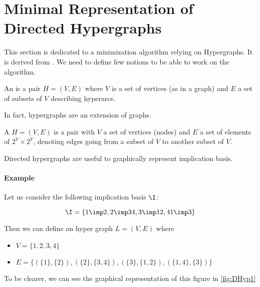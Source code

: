 \section{Minimal Representation of Directed Hypergraphs}

This section is dedicated to a minimization algorithm relying on Hypergraphs. 
It is derived from \cite{ausiello_directed_2017, ausiello_graph_1983, 
ausiello_minimal_1986}. We need to
define few notions to be able to work on the algorithm. 

\begin{definition} An  is a pair $H = 
(V, E)$ 
where $V$ is a set of vertices (as in a graph) and $E$ a set of subsets of $V$
describing hyperarcs.

\end{definition}

\noindent In fact, hypergraphs are an extension of graphs. 

\begin{definition} A  
$H = (V, E)$ is a pair with $V$ a set of vertices (nodes) and $E$ a set of 
elements of $2^V \times 2^V$, denoting edges going from a subset of $V$ to 
another subset of $V$.
	
\end{definition}

Directed hypergraphs are useful to graphically represent implication basis.

\paragraph{Example} Let us consider the following implication basis $\I$:

	\[ \I = \{ 1 \imp 2, 2 \imp 34, 3 \imp 12, 41 \imp 3 \} \]

\noindent Then we can define an hyper graph $L = (V, E)$ where
	\begin{itemize}
		\item $V = \{1, 2, 3, 4 \}$
		\item $E = \{ (\{ 1 \}, \{ 2\}), (\{ 2 \}, \{3, 4\}),
			(\{ 3 \}, \{ 1, 2\}), (\{1, 4\}, \{ 3\}) \}$
	\end{itemize}

\noindent To be clearer, we can see the graphical representation of this figure
in \ref{fig:DHyp1}

\begin{center}
	
\end{center}

